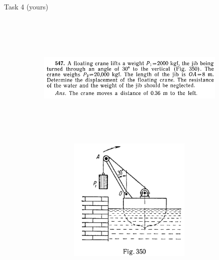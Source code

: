 \documentclass[aspectratio=169]{beamer}
\newcommand{\fbckg}[1]{\usebackgroundtemplate{\texttt{[image: \#1]}}}%
\begin{document}
    \begin{frame}[t]{Task 4 (yours)}
    \framesubtitle{}
        \begin{figure}[H]
            \vspace{-2.0cm}
            \begin{subfigure}{0.69\textwidth}
                \includegraphics[height=6cm,width=1\textwidth,keepaspectratio]{image13.png}
            \end{subfigure}
            \begin{subfigure}{0.29\textwidth}
                \vspace{2.0cm}
                \centering\includegraphics[height=6cm,width=1\textwidth,keepaspectratio]{image8.png}
                \label{fig:image8}
            \end{subfigure}
        \end{figure}
    \end{frame}

\fbckg{fibeamer/figs/last_page.png}
\frame[plain]{}
\end{document}
